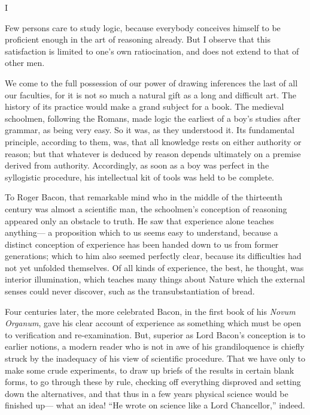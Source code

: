 \documentclass[]{article}
\newcommand*{\itemsection}[1]{\bigskip\centerline{#1}\nopagebreak}
\begin{document}
\itemsection{I}


Few persons care to study logic, because everybody conceives himself to be proficient enough in the art of reasoning already. But I observe that this satisfaction is limited to one's own ratiocination, and does not extend to that of other men.

We come to the full possession of our power of drawing inferences the last of all our faculties, for it is not so much a natural gift as a long and difficult art. The history of its practice would make a grand subject for a book. The medieval schoolmen, following the Romans, made logic the earliest of a boy's studies after grammar, as being very easy. So it was, as they understood it. Its fundamental principle, according to them, was, that all knowledge rests on either authority or reason; but that whatever is deduced by reason depends ultimately on a premise derived from authority. Accordingly, as soon as a boy was perfect in the syllogistic procedure, his intellectual kit of tools was held to be complete.

To Roger Bacon, that remarkable mind who in the middle of the thirteenth century was almost a scientific man, the schoolmen's conception of reasoning appeared only an obstacle to truth. He saw that experience alone teaches anything--- a proposition which to us seems easy to understand, because a distinct conception of experience has been handed down to us from former generations; which to him also seemed perfectly clear, because its difficulties had not yet unfolded themselves. Of all kinds of experience, the best, he thought, was interior illumination, which teaches many things about Nature which the external senses could never discover, such as the transubstantiation of bread.

Four centuries later, the more celebrated Bacon, in the first book of his \emph{Novum Organum}, gave his clear account of experience as something which must be open to verification and re-examination. But, superior as Lord Bacon's conception is to earlier notions, a modern reader who is not in awe of his grandiloquence is chiefly struck by the inadequacy of his view of scientific procedure. That we have only to make some crude experiments, to draw up briefs of the results in certain blank forms, to go through these by rule, checking off everything disproved and setting down the alternatives, and that thus in a few years physical science would be finished up--- what an idea! ``He wrote on science like a Lord Chancellor,'' indeed. 
\end{document}
